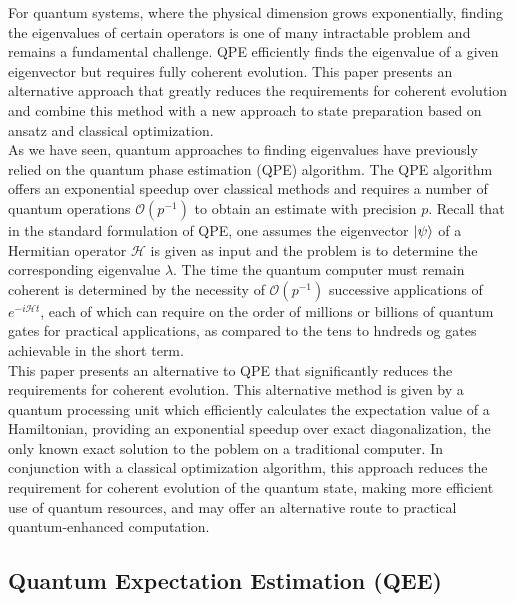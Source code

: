 \documentclass{book}
\theoremstyle{definition}
\newcommand{\had}{\mathcal{H}}
\begin{document}
For quantum systems, where the physical dimension grows exponentially, finding the eigenvalues of certain operators is one of many intractable problem and remains a fundamental challenge.  QPE efficiently finds the eigenvalue of a given eigenvector but requires fully coherent evolution. This paper presents an alternative approach that greatly reduces the requirements for coherent evolution and combine this method with a new approach to state preparation based on ansatz and classical optimization. \\

As we have seen, quantum approaches to finding eigenvalues
have previously relied on the quantum phase estimation (QPE)
algorithm. The QPE algorithm offers an exponential speedup
over classical methods and requires a number of quantum operations $\mathcal{O}(p^{-1})$ to obtain an estimate with precision $p$. Recall that in the standard formulation of QPE, one assumes the eigenvector $\ket{\psi}$ of a Hermitian operator $\had$ is given as input and the problem is to determine the corresponding eigenvalue $\lambda$. The time the
quantum computer must remain coherent is determined by the
necessity of $\mathcal{O}(p^{-1})$ successive applications of $e^{-i \had t}$, each of which can require on the order of millions or billions of quantum gates for practical applications, as compared to the tens to hndreds og gates achievable in the short term. \\

This paper presents an alternative to QPE that significantly reduces the requirements for coherent evolution. This alternative method is given by a quantum processing unit which efficiently calculates the expectation value of a Hamiltonian, providing an exponential speedup over exact diagonalization, the only known exact solution to the poblem on a traditional computer. In conjunction with a classical optimization algorithm, this approach reduces the requirement for coherent evolution of the quantum state, making more efficient use of quantum resources, and may offer an alternative route to practical quantum-enhanced computation. 





\subsection{Quantum Expectation Estimation (QEE)}
\end{document}
